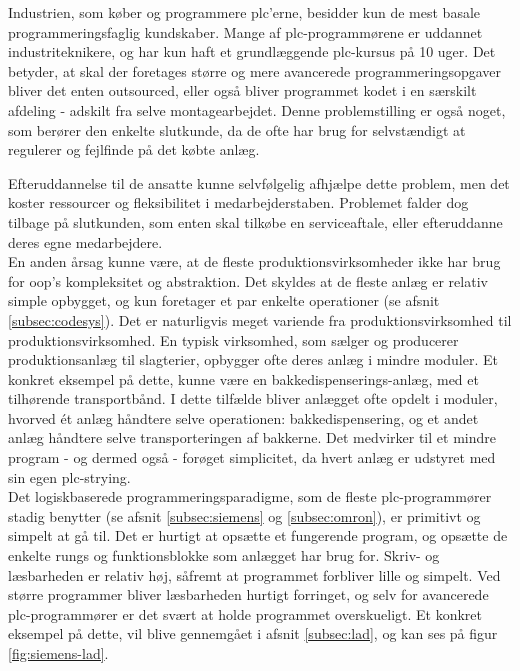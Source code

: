 \noindent Industrien, som køber og programmere \gls{plc}'erne, besidder kun de mest basale programmeringsfaglig kundskaber. Mange af \gls{plc}-programmørene er uddannet industriteknikere, og har kun haft et grundlæggende \gls{plc}-kursus på 10 uger. Det betyder, at skal der foretages større og mere avancerede programmeringsopgaver bliver det enten outsourced, eller også bliver programmet kodet i en særskilt afdeling - adskilt fra selve montagearbejdet. Denne problemstilling er også noget, som berører den enkelte slutkunde, da de ofte har brug for selvstændigt at regulerer og fejlfinde på det købte anlæg.

\noindent Efteruddannelse til de ansatte kunne selvfølgelig afhjælpe dette problem, men det koster ressourcer og fleksibilitet i medarbejderstaben. Problemet falder dog tilbage på slutkunden, som enten skal tilkøbe en serviceaftale, eller efteruddanne deres egne medarbejdere. \\

\noindent En anden årsag kunne være, at de fleste produktionsvirksomheder ikke har brug for \gls{oop}'s kompleksitet og abstraktion. Det skyldes at de fleste anlæg er relativ simple opbygget, og kun foretager et par enkelte operationer (se afsnit \ref{subsec:codesys}). Det er naturligvis meget variende fra produktionsvirksomhed til produktionsvirksomhed. En typisk virksomhed, som sælger og producerer produktionsanlæg til slagterier, opbygger ofte deres anlæg i mindre moduler. Et konkret eksempel på dette, kunne være en bakkedispenserings-anlæg, med et tilhørende transportbånd. I dette tilfælde bliver anlægget ofte opdelt i moduler, hvorved ét anlæg håndtere selve operationen: bakkedispensering, og et andet anlæg håndtere selve transporteringen af bakkerne. Det medvirker til et mindre program - og dermed også - forøget simplicitet, da hvert anlæg er udstyret med sin egen \gls{plc}-strying. \\

\noindent Det logiskbaserede programmeringsparadigme, som de fleste \gls{plc}-programmører stadig benytter (se afsnit \ref{subsec:siemens} og \ref{subsec:omron}), er primitivt og simpelt at gå til. Det er hurtigt at opsætte et fungerende program, og opsætte de enkelte rungs og funktionsblokke som anlægget har brug for. Skriv- og læsbarheden er relativ høj, såfremt at programmet forbliver lille og simpelt. Ved større programmer bliver læsbarheden hurtigt forringet, og selv for avancerede \gls{plc}-programmører er det svært at holde programmet overskueligt. Et konkret eksempel på dette, vil blive gennemgået i afsnit \ref{subsec:lad}, og kan ses på figur \ref{fig:siemens-lad}. 

